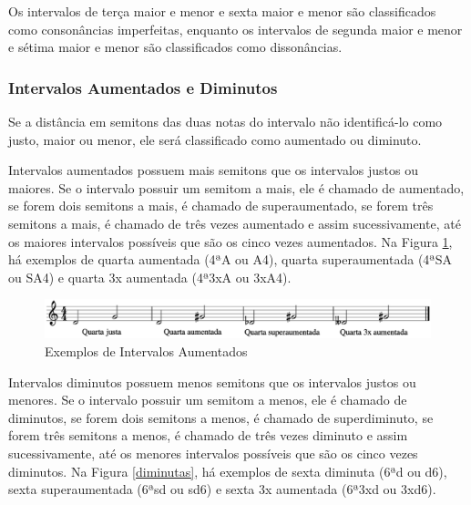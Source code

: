         Os intervalos de terça maior e menor e sexta maior e menor são classificados como consonâncias imperfeitas, enquanto os intervalos de segunda maior e menor e sétima maior e menor são classificados como dissonâncias.

      \subsubsection[Intervalos Aumentados e Diminutos]{Intervalos Aumentados e Diminutos}

        Se a distância em semitons das duas notas do intervalo não identificá-lo como justo, maior ou menor, ele será classificado como aumentado ou diminuto.

        Intervalos aumentados possuem mais semitons que os intervalos justos ou maiores. Se o intervalo possuir um semitom a mais, ele é chamado de aumentado, se forem dois semitons a mais, é chamado de superaumentado, se forem três semitons a mais, é chamado de três vezes aumentado e assim sucessivamente, até os maiores intervalos possíveis que são os cinco vezes aumentados. Na Figura \ref{aumentadas}, há exemplos de quarta aumentada (4ªA ou A4), quarta superaumentada (4ªSA ou SA4\footnotemark {}) e quarta 3x aumentada (4ª3xA ou 3xA4\footnotemark {}).

        \begin{figure}[htb]
          \centering
          \includegraphics[scale=0.4]{figuras/aumentadas.eps}
          \caption{Exemplos de Intervalos Aumentados}
          \label{aumentadas}
        \end{figure}

        Intervalos diminutos possuem menos semitons que os intervalos justos ou menores. Se o intervalo possuir um semitom a menos, ele é chamado de diminutos, se forem dois semitons a menos, é chamado de superdiminuto, se forem três semitons a menos, é chamado de três vezes diminuto e assim sucessivamente, até os menores intervalos possíveis que são os cinco vezes diminutos. Na Figura \ref{diminutas}, há exemplos de sexta diminuta (6ªd ou d6), sexta superaumentada (6ªsd ou sd6\footnotemark {}) e sexta 3x aumentada (6ª3xd ou 3xd6\footnotemark {}).

